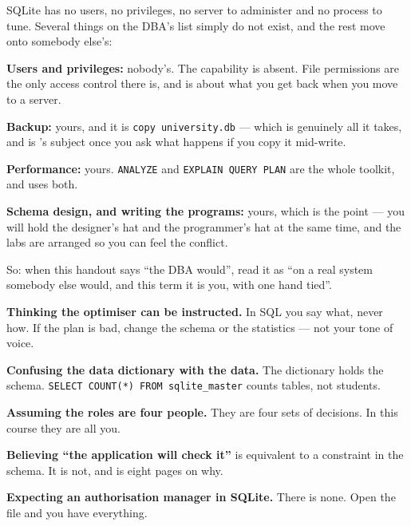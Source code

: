 \begin{alertbox}
SQLite has no users, no privileges, no server to administer and no process to
tune. Several things on the DBA's list simply do not exist, and the rest move
onto somebody else's:

\begin{tight}
  \item \textbf{Users and privileges:} nobody's. The capability is absent. File
        permissions are the only access control there is, and
         is about what you get back when you move to a server.
  \item \textbf{Backup:} yours, and it is \texttt{copy university.db} --- which
        is genuinely all it takes, and is 's subject once
        you ask what happens if you copy it mid-write.
  \item \textbf{Performance:} yours. \texttt{ANALYZE} and
        \texttt{EXPLAIN QUERY PLAN} are the whole toolkit, and
         uses both.
  \item \textbf{Schema design, and writing the programs:} yours, which is the
        point --- you will hold the designer's hat and the programmer's hat at
        the same time, and the labs are arranged so you can feel the conflict.
\end{tight}

\smallskip
So: when this handout says ``the DBA would'', read it as ``on a real system
somebody else would, and this term it is you, with one hand tied''.
\end{alertbox}

\begin{pitfall}
\begin{tight}
  \item \textbf{Thinking the optimiser can be instructed.} In SQL you say what,
        never how. If the plan is bad, change the schema or the statistics ---
        not your tone of voice.
  \item \textbf{Confusing the data dictionary with the data.} The dictionary
        holds the schema. \texttt{SELECT COUNT(*) FROM sqlite\_master} counts
        tables, not students.
  \item \textbf{Assuming the roles are four people.} They are four sets of
        decisions. In this course they are all you.
  \item \textbf{Believing ``the application will check it''} is equivalent to a
        constraint in the schema. It is not, and  is eight
        pages on why.
  \item \textbf{Expecting an authorisation manager in SQLite.} There is none.
        Open the file and you have everything.
\end{tight}
\end{pitfall}

